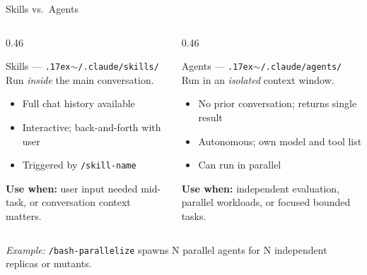 \documentclass[aspectratio=169, 10pt]{beamer}
\begin{document}
\begin{frame}{Skills vs.\ Agents}
  \begin{columns}[T]
    \begin{column}{0.46\textwidth}
      \begin{block}{Skills --- \texttt{{\raise.17ex\hbox{$\scriptstyle\sim$}}/.claude/skills/}}
        \small Run \emph{inside} the main conversation.
        \begin{itemize}[label=\textbullet]\setlength\itemsep{3pt}
          \item Full chat history available
          \item Interactive; back-and-forth with user
          \item Triggered by \texttt{/skill-name}
        \end{itemize}
        \vspace{0.3em}
        \textbf{Use when:} user input needed mid-task, or conversation context matters.
      \end{block}
    \end{column}
    \begin{column}{0.46\textwidth}
      \begin{block}{Agents --- \texttt{{\raise.17ex\hbox{$\scriptstyle\sim$}}/.claude/agents/}}
        \small Run in an \emph{isolated} context window.
        \begin{itemize}[label=\textbullet]\setlength\itemsep{3pt}
          \item No prior conversation; returns single result
          \item Autonomous; own model and tool list
          \item Can run in \alert{parallel}
        \end{itemize}
        \vspace{0.3em}
        \textbf{Use when:} independent evaluation, parallel workloads, or focused bounded tasks.
      \end{block}
    \end{column}
  \end{columns}
  \vspace{0.5em}
  \begin{center}
    \small\textit{Example:} \texttt{/bash-parallelize} spawns N parallel agents for N independent replicas or mutants.
  \end{center}
\end{frame}
\end{document}
